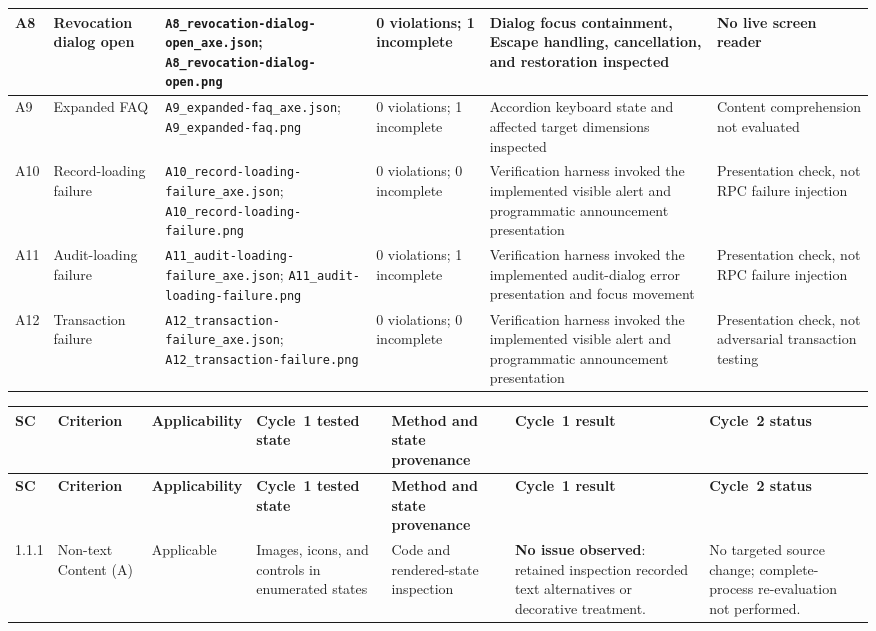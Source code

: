 \documentclass[10pt]{article}
\begin{document}
\begin{landscape}
{\begin{longtable}{|p{1.0cm}|p{2.6cm}|p{4.8cm}|p{4.2cm}|p{5.0cm}|p{4.0cm}|}
A8 & Revocation dialog open & \texttt{A8\_revocation-dialog-open\_axe.json}; \texttt{A8\_revocation-dialog-open.png} & 0 violations; 1 incomplete & Dialog focus containment, Escape handling, cancellation, and restoration inspected & No live screen reader\\\hline
A9 & Expanded FAQ & \texttt{A9\_expanded-faq\_axe.json}; \texttt{A9\_expanded-faq.png} & 0 violations; 1 incomplete & Accordion keyboard state and affected target dimensions inspected & Content comprehension not evaluated\\\hline
A10 & Record-loading failure & \texttt{A10\_record-loading-failure\_axe.json}; \texttt{A10\_record-loading-failure.png} & 0 violations; 0 incomplete & Verification harness invoked the implemented visible alert and programmatic announcement presentation & Presentation check, not RPC failure injection\\\hline
A11 & Audit-loading failure & \texttt{A11\_audit-loading-failure\_axe.json}; \texttt{A11\_audit-loading-failure.png} & 0 violations; 1 incomplete & Verification harness invoked the implemented audit-dialog error presentation and focus movement & Presentation check, not RPC failure injection\\\hline
A12 & Transaction failure & \texttt{A12\_transaction-failure\_axe.json}; \texttt{A12\_transaction-failure.png} & 0 violations; 0 incomplete & Verification harness invoked the implemented visible alert and programmatic announcement presentation & Presentation check, not adversarial transaction testing\\\hline
\end{longtable}
}
\clearpage
{\scriptsize
\setlength{\tabcolsep}{3pt}
\renewcommand{\arraystretch}{1.10}
\begin{longtable}{|p{1.0cm}|p{3.3cm}|p{1.9cm}|p{2.7cm}|p{2.5cm}|p{4.1cm}|p{4.1cm}|}
\hline
\textbf{SC} & \textbf{Criterion} & \textbf{Applicability} & \textbf{Cycle~1 tested state} & \textbf{Method and state provenance} & \textbf{Cycle~1 result} & \textbf{Cycle~2 status}\\\hline
\endfirsthead
\hline
\textbf{SC} & \textbf{Criterion} & \textbf{Applicability} & \textbf{Cycle~1 tested state} & \textbf{Method and state provenance} & \textbf{Cycle~1 result} & \textbf{Cycle~2 status}\\\hline
\endhead
1.1.1 & Non-text Content (A) & Applicable & Images, icons, and controls in enumerated states & Code and rendered-state inspection & \textbf{No issue observed}: retained inspection recorded text alternatives or decorative treatment. & No targeted source change; complete-process re-evaluation not performed.\\\hline

\end{longtable}}
\end{landscape}
\end{document}
